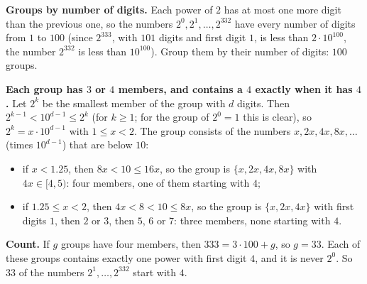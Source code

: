 \textbf{Groups by number of digits.} Each power of $2$ has at most one more digit than the previous one, so the numbers $2^0,2^1,\dots,2^{332}$ have every number of digits from $1$ to $100$ (since $2^{333}$, with $101$ digits and first digit $1$, is less than $2\cdot10^{100}$, the number $2^{332}$ is less than $10^{100}$). Group them by their number of digits: $100$ groups.

\textbf{Each group has $3$ or $4$ members, and contains a $4$ exactly when it has $4$.} Let $2^k$ be the smallest member of the group with $d$ digits. Then $2^{k-1}<10^{d-1}\le2^k$ (for $k\ge1$; for the group of $2^0=1$ this is clear), so $2^k=x\cdot10^{d-1}$ with $1\le x<2$. The group consists of the numbers $x,2x,4x,8x,\ldots$ (times $10^{d-1}$) that are below $10$:
\begin{itemize}
\item if $x<1.25$, then $8x<10\le16x$, so the group is $\{x,2x,4x,8x\}$ with $4x\in[4,5)$: four members, one of them starting with $4$;
\item if $1.25\le x<2$, then $4x<8<10\le8x$, so the group is $\{x,2x,4x\}$ with first digits $1$, then $2$ or $3$, then $5$, $6$ or $7$: three members, none starting with $4$.
\end{itemize}

\textbf{Count.} If $g$ groups have four members, then $333=3\cdot100+g$, so $g=33$. Each of these groups contains exactly one power with first digit $4$, and it is never $2^0$. So $\boxed{33}$ of the numbers $2^1,\dots,2^{332}$ start with $4$.
